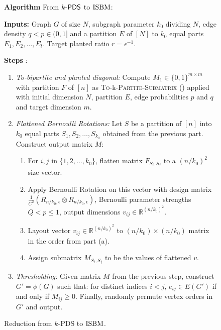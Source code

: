\documentclass[final,12pt]{colt2023} %
\newcommand\1[1]{\mathbb{I}_{\left\{#1\right\}}}
\begin{document}
 \begin{figure}[h!]
     \begin{mdframed}[innerrightmargin=15pt]
 \textbf{Algorithm } From $k$-$\mathsf{PDS}$ to $\textup{ISBM}$:
 
\spac        \textbf{Inputs:} Graph $G$ of size $N$, subgraph parameter $k_0$ dividing $N$, edge density $q < p\in (0, 1]$ and a partition $E$ of $[N]$ to $k_0$ equal parts $E_1, E_2,\dots, E_t$. Target planted ratio $r=\epsilon^{-1}$.
         
\spac        \textbf{Steps }:
        \vspace{-3pt}
        \begin{enumerate}
             \item \textit{To-bipartite and planted diagonal:} Compute $M_1 \in \{0, 1\}^{m\times m}$ with partition $F$ of $[n]$ as
             \textsc{To-}k\textsc{-Partite-Submatrix} ()
            applied with initial dimension $N$, partition $E$, edge probabilities $p$ and $q$ and target dimension $m$.
            \item \textit{Flattened Bernoulli Rotations:} Let $S$ be a partition of $[n]$ into $k_0$ equal parts $S_1, S_2,\dots, S_{k_0}$ obtained from the previous part. Construct output matrix $M$:
            \begin{enumerate}
                \item For $i, j$ in $\{1,2,\dots,k_0\}$, flatten matrix $F_{S_i, S_j}$ to a $(n/k_0)^2$ size vector.
                \item Apply Bernoulli Rotation on this vector with design matrix $\frac{1}{C^2}\left( R_{n/k_0,  \epsilon}\otimes R_{n/k_0, \epsilon}\right)$, Bernoulli parameter strengths $Q<p\leq 1$, output dimensions $v_{ij}\in \mathbb{R}^{(n/k_0)^2}$.
                \item Layout vector $v_{ij}\in \mathbb{R}^{(n/k_0)^2}$ to $(n/k_0)\times (n/k_0)$ matrix in the order from part (a).
                \item Assign submatrix $M_{S_i, S_j}$ to be the values of flattened $v$.
            \end{enumerate}
            \item \textit{Thresholding:} Given matrix $M$ from the previous step, construct $G'=\phi(G)$ such that: for distinct indices $i<j$, $e_{ij}\in E(G')$ if and only if $M_{ij}\geq 0.$ Finally, randomly permute vertex orders in $G'$ and output.
        \end{enumerate}
        \vspace{.5mm}
        \end{mdframed}
     \caption{\footnotesize Reduction from $k$-PDS to $\textup{ISBM}$.}
 \end{figure}
\end{document}
